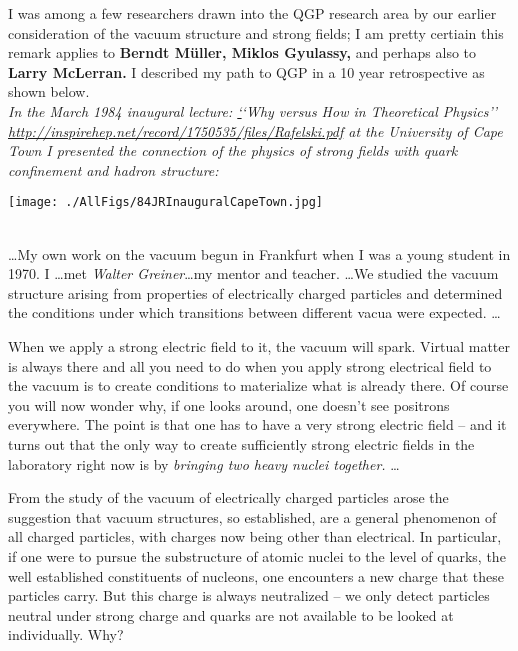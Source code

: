 I was among a few researchers drawn into the QGP research area by our earlier consideration of the vacuum structure and strong fields; I am pretty certiain this remark applies to \textbf{Berndt M\"uller, Miklos Gyulassy,} and perhaps also to \textbf{Larry McLerran.} I described my path to QGP in a 10 year retrospective as shown below.\\

\noindent \textit{In the March 1984 inaugural lecture: \href{http://inspirehep.net/record/1750535/files/Rafelski.pdf}\lq\lq Why versus How in Theoretical Physics\rq\rq~\cite{Rafelski:1984twl} \url{http://inspirehep.net/record/1750535/files/Rafelski.pdf} at the University of Cape Town I presented the connection of the physics of strong fields with quark confinement and hadron structure:}\\[-0.7cm]
%
\begin{mdframed}[linecolor=gray,roundcorner=12pt,backgroundcolor=Dandelion!15,linewidth=1pt,leftmargin=0cm,rightmargin=0cm,topline=true,bottomline=true,skipabove=12pt]\relax%
%
\centerline{\texttt{[image: ./AllFigs/84JRInauguralCapeTown.jpg]}}
{}\\

\noindent \ldots My own work on the vacuum\label{JRVac} begun in Frankfurt when I was a young student in 1970. I \ldots met \emph{Walter Greiner}\ldots my mentor and teacher. \ldots We studied the vacuum structure arising from properties of electrically charged particles and determined the conditions under which transitions between different vacua were expected. \ldots 

When we apply a strong electric field to it, the vacuum will spark. Virtual matter is always there and all you need to do when you apply strong electrical field to the vacuum is to create conditions to materialize what is already there. Of course you will now wonder why, if one looks around, one doesn\rq t see positrons everywhere. The point is that one has to have a very strong electric field -- and it turns out that the only way to create sufficiently strong electric fields in the laboratory right now is by \emph{bringing two heavy nuclei together.} \ldots

From the study of the vacuum of electrically charged particles arose the suggestion that vacuum structures, so established, are a general phenomenon of all charged particles, with charges now being other than electrical. In particular, if one were to pursue the substructure of atomic nuclei to the level of quarks, the well established constituents of nucleons, one encounters a new charge that these particles carry. But this charge is always neutralized -- we only detect particles neutral under strong charge and quarks are not available to be looked at individually. Why?


\end{mdframed}
